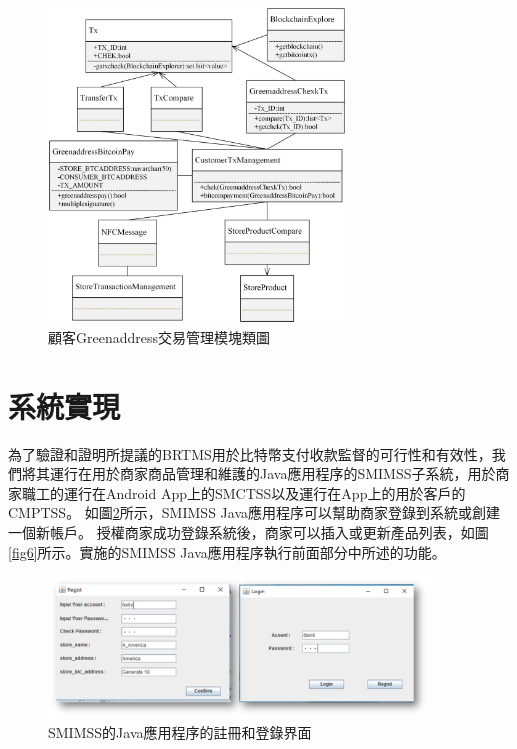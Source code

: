 	\begin{figure}[!htbp]
		\centering
		\includegraphics[width = 0.7\textwidth]{c6.jpg}
		\caption{顧客Greenaddress交易管理模塊類圖}\label{c6}
	\end{figure}

\section{系統實現}


為了驗證和證明所提議的BRTMS用於比特幣支付收款監督的可行性和有效性，我們將其運行在用於商家商品管理和維護的Java應用程序的SMIMSS子系統，用於商家職工的運行在Android App上的SMCTSS以及運行在App上的用於客戶的CMPTSS。
如圖\ref{fig5}所示，SMIMSS Java應用程序可以幫助商家登錄到系統或創建一個新帳戶。 授權商家成功登錄系統後，商家可以插入或更新產品列表，如圖\ref{fig6}所示。實施的SMIMSS Java應用程序執行前面部分中所述的功能。

\begin{figure}[!htbp]
	\centering
	\includegraphics[width = 0.9\textwidth]{fig5.png}
	\caption{SMIMSS的Java應用程序的註冊和登錄界面}\label{fig5}
\end{figure}

